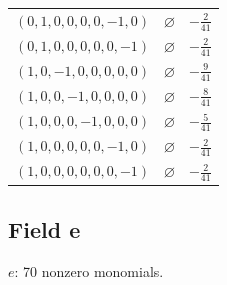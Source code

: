 \begin{longtable}{@{}lll@{}}
$(0,1,0,0,0,0,-1,0)$ & $\varnothing$ & $-\frac{2}{41}$\\
$(0,1,0,0,0,0,0,-1)$ & $\varnothing$ & $-\frac{2}{41}$\\
$(1,0,-1,0,0,0,0,0)$ & $\varnothing$ & $-\frac{9}{41}$\\
$(1,0,0,-1,0,0,0,0)$ & $\varnothing$ & $-\frac{8}{41}$\\
$(1,0,0,0,-1,0,0,0)$ & $\varnothing$ & $-\frac{5}{41}$\\
$(1,0,0,0,0,0,-1,0)$ & $\varnothing$ & $-\frac{2}{41}$\\
$(1,0,0,0,0,0,0,-1)$ & $\varnothing$ & $-\frac{2}{41}$\\
\end{longtable}
\endgroup

\subsection{Field e}
$e$: 70 nonzero monomials.

